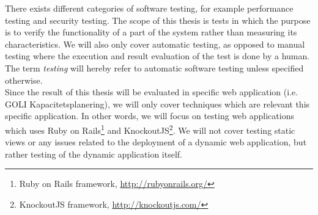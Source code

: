 There exists different categories of software testing, for example
performance testing and security testing. The scope of this thesis is
tests in which the purpose is to verify the functionality of a part of
the system rather than measuring its characteristics. We will also only
cover automatic testing, as opposed to manual testing where the
execution and result evaluation of the test is done by a human. The term
\emph{testing} will hereby refer to automatic software testing unless
specified otherwise.\\

Since the result of this thesis will be evaluated in specific web
application (i.e. GOLI Kapacitetsplanering), we will only cover
techniques which are relevant this specific application. In other words,
we will focus on testing web applications which uses Ruby on
Rails\footnote{Ruby on Rails framework, \url{http://rubyonrails.org/}}
and KnockoutJS\footnote{KnockoutJS framework,
\url{http://knockoutjs.com/}}. We will not cover testing static views
or any issues related to the deployment of a dynamic web application,
but rather testing of the dynamic application itself.\\
